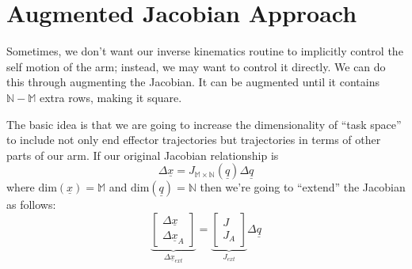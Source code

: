 \documentclass[]{article}
\begin{document}
\section{Augmented Jacobian Approach}
Sometimes, we don't want our inverse kinematics routine to implicitly control the self motion of the arm; instead, we may want to control it directly. We can do this through augmenting the Jacobian. It can be augmented until it contains $\mathbb{N}-\mathbb{M}$ extra rows, making it square.

\begin{figure}[h!]
	\centering
\end{figure}
The basic idea is that we are going to increase the dimensionality of ``task space'' to include not only end effector trajectories but trajectories in terms of other parts of our arm. If our original Jacobian relationship is
\begin{displaymath}
 \Delta\underline{x} = J_{\mathbb{M}\times\mathbb{N}}(\underline{q})\Delta\underline{q}
\end{displaymath}
where $\text{dim}(\underline{x}) = \mathbb{M}$ and $\text{dim}(\underline{q}) = \mathbb{N}$
then we're going to ``extend'' the Jacobian as follows:
\begin{displaymath}
 \underbrace{\left[ \begin{array}{c}\Delta\underline{x} \\ \Delta\underline{x}_{A}\end{array}\right]}_{\Delta\underline{x}_{ext}} = \underbrace{\left[ \begin{array}{c} J \\ J_{A} \end{array} \right]}_{J_{ext}} \Delta\underline{q}
\end{displaymath}
\end{document}
